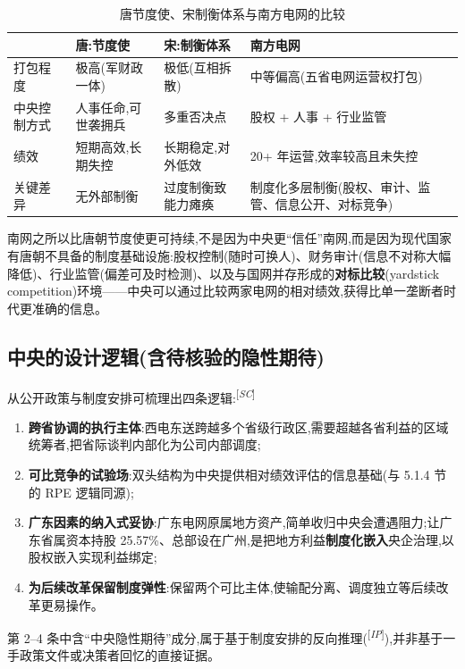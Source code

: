 \documentclass[UTF8,12pt,a4paper]{ctexrep}
\newcommand{\src}[1]{\textsuperscript{[\emph{#1}]}}
\begin{document}
\begin{table}[htbp]
  \centering
  \small
  \caption{唐节度使、宋制衡体系与南方电网的比较}
  \label{tab:csg-compare}
  \begin{tabularx}{\linewidth}{@{}lXXX@{}}
    \toprule
    & \textbf{唐:节度使} & \textbf{宋:制衡体系} & \textbf{南方电网} \\
    \midrule
    打包程度 & 极高(军财政一体) & 极低(互相拆散) & 中等偏高(五省电网运营权打包) \\
    中央控制方式 & 人事任命,可世袭拥兵 & 多重否决点 & 股权 + 人事 + 行业监管 \\
    绩效 & 短期高效,长期失控 & 长期稳定,对外低效 & 20+ 年运营,效率较高且未失控 \\
    关键差异 & 无外部制衡 & 过度制衡致能力瘫痪 & 制度化多层制衡(股权、审计、监管、信息公开、对标竞争) \\
    \bottomrule
  \end{tabularx}
\end{table}

南网之所以比唐朝节度使更可持续,不是因为中央更``信任''南网,而是因为现代国家有唐朝不具备的制度基础设施:股权控制(随时可换人)、财务审计(信息不对称大幅降低)、行业监管(偏差可及时检测)、以及与国网并存形成的\textbf{对标比较}(yardstick competition)环境——中央可以通过比较两家电网的相对绩效,获得比单一垄断者时代更准确的信息。

\subsection{中央的设计逻辑(含待核验的隐性期待)}

从公开政策与制度安排可梳理出四条逻辑:\src{SC}

\begin{enumerate}
  \item \textbf{跨省协调的执行主体}:西电东送跨越多个省级行政区,需要超越各省利益的区域统筹者,把省际谈判内部化为公司内部调度;
  \item \textbf{可比竞争的试验场}:双头结构为中央提供相对绩效评估的信息基础(与 5.1.4 节的 RPE 逻辑同源);
  \item \textbf{广东因素的纳入式妥协}:广东电网原属地方资产,简单收归中央会遭遇阻力;让广东省属资本持股 25.57\%、总部设在广州,是把地方利益\textbf{制度化嵌入}央企治理,以股权嵌入实现利益绑定;
  \item \textbf{为后续改革保留制度弹性}:保留两个可比主体,使输配分离、调度独立等后续改革更易操作。
\end{enumerate}

第 2--4 条中含``中央隐性期待''成分,属于基于制度安排的反向推理(\src{IP}),并非基于一手政策文件或决策者回忆的直接证据。
\end{document}
